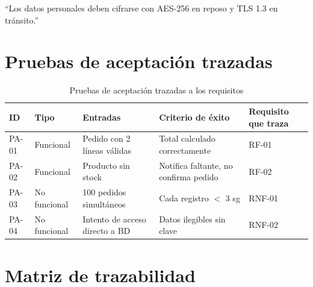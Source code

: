 \documentclass[11pt,a4paper]{article}
\begin{document}
``Los datos personales deben cifrarse con AES-256 en reposo y TLS 1.3 en tránsito.''



\section{Pruebas de aceptación trazadas}

\begin{table}[h!]
\centering
\small

\begin{tabular}{lllll}

\toprule

\textbf{ID}
&
\textbf{Tipo}
&
\textbf{Entradas}
&
\textbf{Criterio de éxito}
&
\textbf{Requisito que traza}
\\

\midrule

PA-01
&
Funcional
&
Pedido con 2 líneas válidas
&
Total calculado correctamente
&
RF-01
\\

PA-02
&
Funcional
&
Producto sin stock
&
Notifica faltante, no confirma pedido
&
RF-02
\\

PA-03
&
No funcional
&
100 pedidos simultáneos
&
Cada registro $<$ 3 sg
&
RNF-01
\\

PA-04
&
No funcional
&
Intento de acceso directo a BD
&
Datos ilegibles sin clave
&
RNF-02
\\

\bottomrule

\end{tabular}

\caption{Pruebas de aceptación trazadas a los requisitos}

\end{table}



\section{Matriz de trazabilidad}
\end{document}
